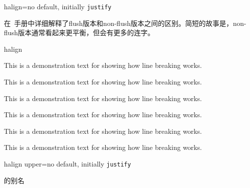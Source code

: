 \begin{docTcbKey}[][doc new=2015-05-07]{halign}{=}{no default, initially \texttt{justify}}

在\tikzname\ 手册\cite{tantau:tikz_and_pgf}中详细解释了flush版本和non-flush版本之间的区别。简短的故事是，non-flush版本通常看起来更平衡，但会有更多的连字。

\begin{exdispExample}{halign}

\begin{tcolorbox}[adjusted title=flush center,halign=flush center]
This is a demonstration text for showing how line breaking works.
\end{tcolorbox}
\begin{tcolorbox}[adjusted title=flush left,halign=flush left]
This is a demonstration text for showing how line breaking works.
\end{tcolorbox}
\begin{tcolorbox}[adjusted title=flush right,halign=flush right]
This is a demonstration text for showing how line breaking works.
\end{tcolorbox}

\begin{tcolorbox}[adjusted title=center,halign=center]
This is a demonstration text for showing how line breaking works.
\end{tcolorbox}
\begin{tcolorbox}[adjusted title=left,halign=left]
This is a demonstration text for showing how line breaking works.
\end{tcolorbox}
\begin{tcolorbox}[adjusted title=right,halign upper=right]
This is a demonstration text for showing how line breaking works.
\end{tcolorbox}
\end{exdispExample}

\end{docTcbKey}


\begin{docTcbKey}[][doc new=2015-05-07]{halign upper}{=}{no default, initially \texttt{justify}}

 的别名
\end{docTcbKey}



